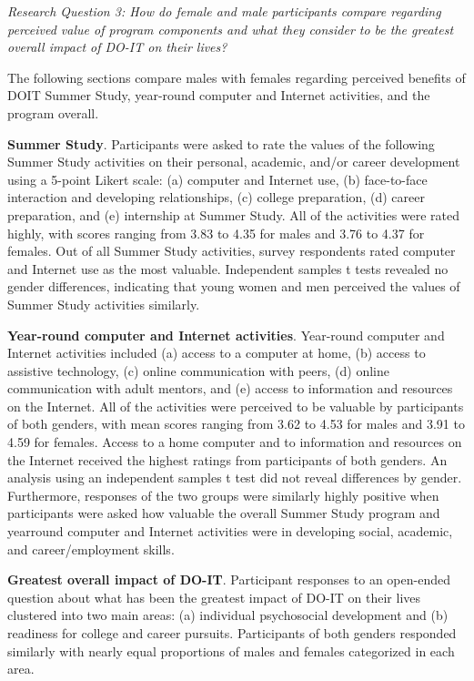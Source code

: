\documentclass[11.5pt]{sig-alternate} %
\begin{document}
\begin{large}
\textit{Research Question 3: How do female and male participants compare regarding perceived value of program components and what they consider to be the greatest overall impact of DO-IT on their lives? }
 
The following sections compare males with females regarding perceived benefits of DOIT Summer Study, year-round computer and Internet activities, and the program overall. 
 
\textbf{Summer Study}. Participants were asked to rate the values of the following Summer Study activities on their personal, academic, and/or career development using a 5-point Likert scale: (a) computer and Internet use, (b) face-to-face interaction and developing relationships, (c) college preparation, (d) career preparation, and (e) internship at Summer Study. All of the activities were rated highly, with scores ranging from 3.83 to 4.35 for males and 3.76 to 4.37 for females. Out of all Summer Study activities, survey respondents rated computer and Internet use as the most valuable. Independent samples t tests revealed no gender differences, indicating that young women and men perceived the values of Summer Study activities similarly.  
 
\textbf{Year-round computer and Internet activities}. Year-round computer and Internet activities included (a) access to a computer at home, (b) access to assistive technology, (c) online communication with peers, (d) online communication with adult mentors, and (e) access to information and resources on the Internet. All of the activities were perceived to be valuable by participants of both genders, with mean scores ranging from 3.62 to 4.53 for males and 3.91 to 4.59 for females. Access to a home computer and to information and resources on the Internet received the highest ratings from participants of both genders. An analysis using an independent samples t test did not reveal differences by gender. Furthermore, responses of the two groups were similarly highly positive when participants were asked how valuable the overall Summer Study program and yearround computer and Internet activities were in developing social, academic, and career/employment skills. 
 
\textbf{Greatest overall impact of DO-IT}. Participant responses to an open-ended question about what has been the greatest impact of DO-IT on their lives clustered into two main areas: (a) individual psychosocial development and (b) readiness for college and career pursuits. Participants of both genders responded similarly with nearly equal proportions of males and females categorized in each area.  
 

\end{large}
\end{document}

